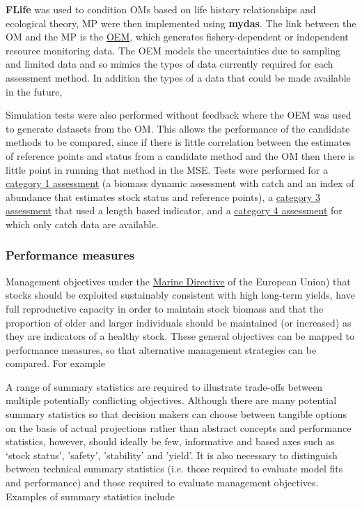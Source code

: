 \textbf{FLife} was used to  condition OMs based on life history relationships and ecological theory, MP were then implemented using \textbf{mydas}. The link between the OM and the MP is the \href{https://3o2y9wugzp1kfxr5hvzgzq-on.drv.tw/MyDas/vignettes/oem.html}{OEM}, which generates fishery-dependent or independent resource monitoring data. The OEM models the uncertainties due to sampling and limited data and so mimics the types of data currently required for each assessment method. In addition the types of a data that could be made available in the future,

Simulation tests were also performed without feedback where the OEM was used to generate datasets from the OM. This allows the performance of the candidate methods to be compared, since if there is little correlation between the estimates of reference points and status from a candidate method and the OM then there is little point in running that method in the MSE. Tests were performed for a 
\href{https://3o2y9wugzp1kfxr5hvzgzq-on.drv.tw/MyDas/tasks/4/R/simtest-bd.pdf}{category 1 assessment} (a biomass dynamic assessment with catch and an index of abundance that estimates stock status and reference points), a \href{https://3o2y9wugzp1kfxr5hvzgzq-on.drv.tw/MyDas/tasks/4/R/simtest-lbspr.pdf}{category 3 assessment} that used a length based indicator, and a \href{https://3o2y9wugzp1kfxr5hvzgzq-on.drv.tw/MyDas/tasks/4/R/simtest-bdsra.pdf}{category 4 assessment} for which only catch data are available.

\subsubsection*{Performance measures} 

Management objectives under the \href{http://ec.europa.eu/environment/marine/good-environmental-status/descriptor-3/index_en.htm}{Marine Directive} of the European Union) that stocks should be exploited sustainably consistent with high long-term yields, have full reproductive capacity in order to maintain stock biomass and that the proportion of older and larger individuals should be maintained (or increased) as they are indicators of a healthy stock. These general objectives can be mapped to performance measures, so that alternative management strategies can be compared. For example

A range of summary statistics are required to illustrate trade-offs between multiple potentially conflicting objectives. Although there are many potential summary statistics so that decision makers can choose between tangible options on the basis of actual projections rather than abstract concepts and performance statistics, however, should ideally be few, informative and based axes such as ‘stock status’, 'safety', 'stability' and 'yield'. It is also necessary to distinguish between technical summary statistics (i.e. those required to evaluate model fits and performance) and those required to evaluate management objectives. Examples of summary statistics include 


